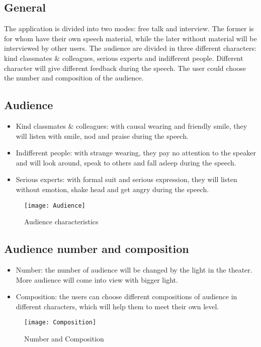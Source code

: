 \subsection{General}
The application is divided into two modes: free talk and interview. The former is for whom have their own speech material, while the later without material will be interviewed by other users. The audience are divided in three different characters: kind classmates \& colleagues, serious experts and indifferent people. Different character will give different feedback during the speech. The user could choose the number and composition of the audience.

\subsection{Audience}
\begin{itemize}
	\item Kind classmates \& colleagues: with causal wearing and friendly smile, they will listen with smile, nod and praise during the speech.
	\item Indifferent people: with strange wearing, they pay no attention to the speaker and will look around, speak to others and fall asleep during the speech.
	\item Serious experts: with formal suit and serious expression, they will listen without emotion, shake head and get angry during the speech.
\end{itemize}

\begin{figure}[H]
	\centering
	\texttt{[image: Audience]}
	\caption{Audience characteristics}
\end{figure}

\subsection{Audience number and composition}
\begin{itemize}
	\item Number: the number of audience will be changed by the light in the theater. More audience will come into view with bigger light.
	\item Composition: the users can choose different compositions of audience in different characters, which will help them to meet their own level.
\end{itemize}

\begin{figure}[H]
	\centering
	\texttt{[image: Composition]}
	\caption{Number and Composition}
\end{figure}

